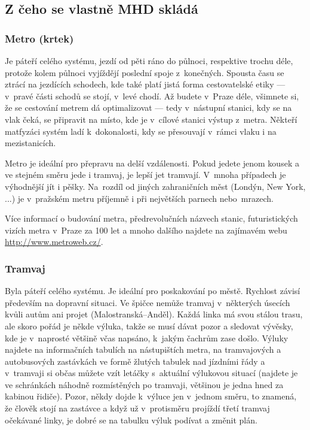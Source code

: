 \subsection{Z čeho se vlastně MHD skládá}
\smallskip
\subsubsection{Metro (krtek)}

Je páteří celého systému, jezdí od pěti ráno do půlnoci,
respektive trochu déle, protože kolem půlnoci vyjíždějí poslední
spoje z~konečných. Spousta času se ztrácí na jezdících schodech,
kde také platí jistá forma cestovatelské etiky --- v~pravé části
schodů se stojí, v~levé chodí. Až budete v~Praze déle, všimnete
si, že se cestování metrem dá optimalizovat --- tedy v~nástupní
stanici, kdy se na vlak čeká, se připravit na místo, kde je
v~cílové stanici výstup z~metra. Někteří matfyzáci systém ladí
k~dokonalosti, kdy se přesouvají v~rámci vlaku i na mezistanicích.


Metro je ideální pro přepravu na delší vzdálenosti. Pokud jedete
jenom kousek a ve stejném směru jede i tramvaj, je lepší jet
tramvají. V~mnoha případech je výhodnější jít i pěšky. Na~rozdíl
od jiných zahraničních měst (Londýn, New York, ...) je v~pražském
metru příjemně i při největších parnech nebo~mrazech.

Více informací o budování metra, předrevolučních názvech stanic,
futuristických vizích metra v~Praze za 100 let a mnoho dalšího
najdete na zajímavém webu \url{http://www.metroweb.cz/}.

\subsubsection{Tramvaj}

Byla páteří celého systému. Je ideální pro poskakování po městě.
Rychlost závisí především na dopravní situaci. Ve špičce nemůže
tramvaj v~některých úsecích kvůli autům ani projet
(Malostranská--Anděl). Každá linka má svou stálou trasu, ale skoro
pořád je někde výluka, takže se musí dávat pozor a sledovat
vývěsky, kde je v~naprosté většině včas napsáno, k~jakým čachrům
zase došlo. Výluky najdete na informačních tabulích na
nástupištích metra, na tramvajových a autobusových zastávkách ve
formě žlutých tabulek nad jízdními řády a v~tramvaji si občas
můžete vzít letáčky s~aktuální výlukovou situací (najdete je ve
schránkách náhodně rozmístěných po tramvaji, většinou je jedna
hned za kabinou řidiče). Pozor, někdy dojde k~výluce jen v~jednom
směru, to znamená, že člověk stojí na zastávce a když už
v~protisměru projíždí třetí tramvaj očekávané linky, je dobré se na
tabulku výluk podívat a změnit plán.

